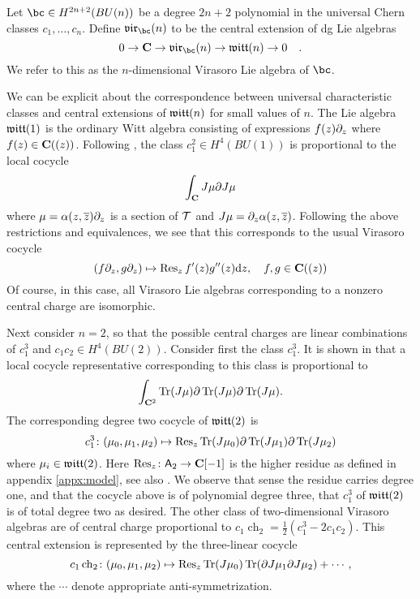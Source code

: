 \documentclass[11pt]{amsart}
\renewcommand{\op}{\operatorname}
\begin{document}
\begin{dfn}
Let $\bc \in H^{2n+2}(BU(n))$ be a degree $2n+2$ polynomial in the universal Chern classes $c_1,\ldots,c_n$.
Define $\lie{vir}_{\bc}(n)$ to be the central extension of dg Lie algebras
\begin{equation}
0 \to \C \to \lie{vir}_{\bc}(n) \to \lie{witt}(n) \to 0  \quad .
\end{equation}
We refer to this as the $n$-dimensional Virasoro Lie algebra of  $\bc$.
\end{dfn}

We can be explicit about the correspondence between universal characteristic classes and central extensions of $\mathfrak{witt}(n)$ for small values of $n$.
The Lie algebra $\mathfrak{witt}(1)$ is the ordinary Witt algebra consisting of expressions $f(z) \partial_z$ where $f(z) \in \mathbf{C}((z))$.
Following \cite{BWgf}, the class $c_1^2 \in H^4(BU(1))$ is proportional to the local cocycle
\begin{equation}
\int_{\mathbf{C}} J \mu \partial J \mu
\end{equation}
where $\mu = \alpha (z,{\overline{z}}) \partial_z$ is a section of $\mathcal T$ and $J \mu = \partial_z \alpha(z,{\overline{z}})$.
Following the above restrictions and equivalences, we see that this corresponds to the usual Virasoro cocycle
\begin{equation}
(f \del_z, g \del_z) \mapsto \op{Res}_z f'(z) g''(z) \d z , \quad f,g \in \C((z))
\end{equation}
Of course, in this case, all Virasoro Lie algebras corresponding to a nonzero central charge are isomorphic.

Next consider $n=2$, so that the possible central charges are linear combinations of $c_1^3$ and $c_1 c_2 \in H^4(BU(2))$.
Consider first the class $c_1^3$.
It is shown in \cite{BWgf} that a local cocycle representative corresponding to this class is proportional to
\begin{equation}
\int_{\C^2} \op{Tr}(J \mu) \del \op{Tr}(J \mu) \del \op{Tr}(J \mu) .
\end{equation}
The corresponding degree two cocycle of $\mathfrak{witt}(2)$ is
\begin{equation}
c_1^3 \colon (\mu_0,\mu_1,\mu_2) \mapsto \op{Res}_z \op{Tr}(J \mu_0) \del \op{Tr}(J \mu_1) \del \op{Tr}(J \mu_2)
\end{equation}
where $\mu_i \in \mathfrak{witt}(2)$.
Here $\op{Res}_z \colon \sfA_2 \to \C[-1]$ is the higher residue as defined in appendix \ref{appx:model}, see also \cite{FHK}.
We observe that sense the residue carries degree one, and that the cocycle above is of polynomial degree three, that $c_1^3$ of $\mathfrak{witt}(2)$ is of total degree two as desired.
The other class of two-dimensional Virasoro algebras are of central charge proportional to $c_1\op{ch}_2 = \frac12 (c_1^3 - 2 c_1 c_2)$.
This central extension is represented by the three-linear cocycle
\begin{equation}
c_1 \ch_2 \colon (\mu_0,\mu_1,\mu_2) \mapsto \op{Res}_z \op{Tr}(J \mu_0) \op{Tr}(\del J \mu_1 \del J \mu_2) + \cdots ,
\end{equation}
where the $\cdots$ denote appropriate anti-symmetrization.
\end{document}
